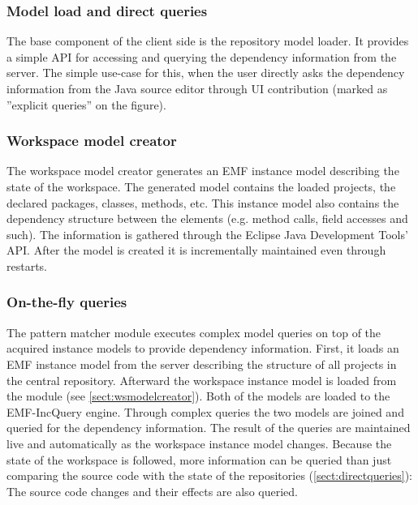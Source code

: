 \subsubsection{Model load and direct queries}\label{sect:directqueries}
The base component of the client side is the repository model loader. It
provides a simple API for accessing and querying the dependency information from
the server. The simple use-case for this, when the user directly asks the
dependency information from the Java source editor through UI contribution
(marked as ''explicit queries'' on the figure).

\subsubsection{Workspace model creator}\label{sect:wsmodelcreator}
The workspace model creator generates an EMF instance model describing the
state of the workspace. The generated model contains the loaded projects, the
declared packages, classes, methods, etc. This instance model also contains the
dependency structure between the elements (e.g. method calls, field accesses and
such). The information is gathered through the Eclipse Java Development Tools'
API. After the model is created it is incrementally maintained even through 
restarts.

\subsubsection{On-the-fly queries}
The pattern matcher module executes complex model queries on top of the acquired
instance models to provide dependency information. First, it loads an EMF
instance model from the server describing the structure of all projects in the
central repository. Afterward the workspace instance model is loaded from the
module (see \autoref{sect:wsmodelcreator}). Both of the models are loaded to the
EMF-IncQuery engine. Through complex queries the two models are joined and
queried for the dependency information. The result of the queries are maintained
live and automatically as the workspace instance model changes. Because the
state of the workspace is followed, more information can be queried than just
comparing the source code with the state of the repositories
(\autoref{sect:directqueries}): The source code changes and their effects
are also queried.

